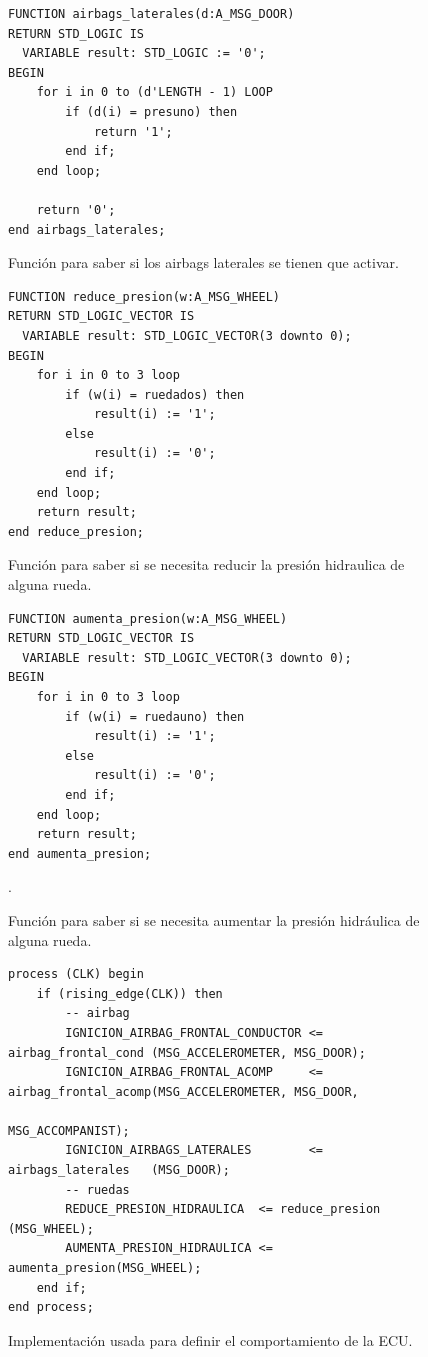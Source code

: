 \documentclass{article}
\begin{document}
\begin{figure}[h]
	\begin{lstlisting}[style=vhdl]
FUNCTION airbags_laterales(d:A_MSG_DOOR)
RETURN STD_LOGIC IS
  VARIABLE result: STD_LOGIC := '0';
BEGIN
	for i in 0 to (d'LENGTH - 1) LOOP
		if (d(i) = presuno) then
			return '1';
		end if;
	end loop;
	
	return '0';	
end airbags_laterales;
	\end{lstlisting}
	\caption{Función para saber si los airbags laterales se tienen que activar.}
	\label{cod:p4:airbags_laterales}
\end{figure}

\begin{figure}[h]
	\begin{lstlisting}[style=vhdl]
FUNCTION reduce_presion(w:A_MSG_WHEEL)
RETURN STD_LOGIC_VECTOR IS
  VARIABLE result: STD_LOGIC_VECTOR(3 downto 0);
BEGIN
	for i in 0 to 3 loop
		if (w(i) = ruedados) then
			result(i) := '1';
		else
			result(i) := '0';
		end if;
	end loop;
	return result;
end reduce_presion;
	\end{lstlisting}
	\caption{Función para saber si se necesita reducir la presión hidraulica de alguna rueda.}
	\label{cod:p4:reduce_presion}
\end{figure}

\begin{figure}[h]
	\begin{lstlisting}[style=vhdl]
FUNCTION aumenta_presion(w:A_MSG_WHEEL)
RETURN STD_LOGIC_VECTOR IS
  VARIABLE result: STD_LOGIC_VECTOR(3 downto 0);
BEGIN
	for i in 0 to 3 loop
		if (w(i) = ruedauno) then
			result(i) := '1';
		else
			result(i) := '0';
		end if;
	end loop;
	return result;
end aumenta_presion;
	\end{lstlisting}
	\caption{Función para saber si se necesita aumentar la presión hidráulica de alguna rueda.}
	\label{cod:p4:aumenta_presion}.
\end{figure}

\begin{figure}[h]
	\begin{lstlisting}[style=vhdl]
process (CLK) begin
	if (rising_edge(CLK)) then
		-- airbag
		IGNICION_AIRBAG_FRONTAL_CONDUCTOR <= airbag_frontal_cond (MSG_ACCELEROMETER, MSG_DOOR);
		IGNICION_AIRBAG_FRONTAL_ACOMP     <= airbag_frontal_acomp(MSG_ACCELEROMETER, MSG_DOOR,
		                                                          MSG_ACCOMPANIST);
		IGNICION_AIRBAGS_LATERALES        <= airbags_laterales   (MSG_DOOR);
		-- ruedas
		REDUCE_PRESION_HIDRAULICA  <= reduce_presion (MSG_WHEEL);
		AUMENTA_PRESION_HIDRAULICA <= aumenta_presion(MSG_WHEEL);
	end if;
end process;
	\end{lstlisting}
	\caption{Implementación usada para definir el comportamiento de la ECU.}
	\label{cod:p4:process}
\end{figure}
\end{document}
